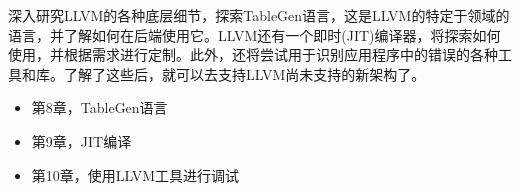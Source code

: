深入研究LLVM的各种底层细节，探索TableGen语言，这是LLVM的特定于领域的语言，并了解如何在后端使用它。LLVM还有一个即时(JIT)编译器，将探索如何使用，并根据需求进行定制。此外，还将尝试用于识别应用程序中的错误的各种工具和库。了解了这些后，就可以去支持LLVM尚未支持的新架构了。

\begin{itemize}
\item
第8章，TableGen语言

\item
第9章，JIT编译

\item
第10章，使用LLVM工具进行调试
\end{itemize}